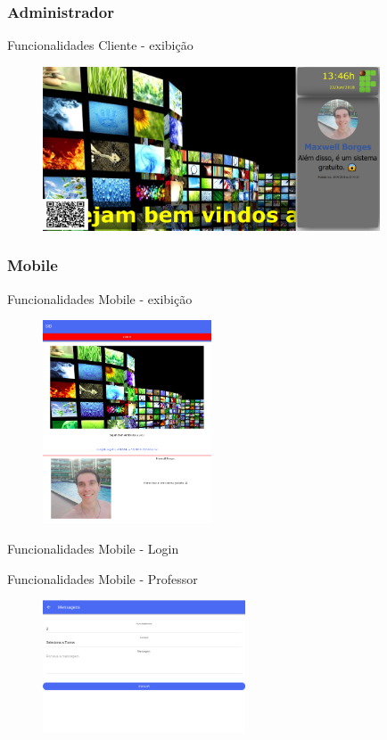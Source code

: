 \documentclass{aula-ifb}
\begin{document}
\subsubsection{Administrador}
\begin{frame}{Funcionalidades Cliente - exibição}
\begin{figure}[h]
\includegraphics[width=10cm]{figuras/funcionalidadeexibir.png}
\label{fig:facebookgraph}
\end{figure}
\end{frame}

\subsubsection{Mobile}
\begin{frame}{Funcionalidades Mobile - exibição}
\begin{figure}[h]
\includegraphics[width=5cm]{figuras/mobile1.png}
\label{fig:facebookgraph}
\end{figure}
\end{frame}

\begin{frame}{Funcionalidades Mobile - Login}

\end{frame}


\begin{frame}{Funcionalidades Mobile - Professor}
\begin{figure}[h]
\includegraphics[width=6cm]{figuras/mobile2.png}
\label{fig:facebookgraph}
\end{figure}
\end{frame}
\end{document}

